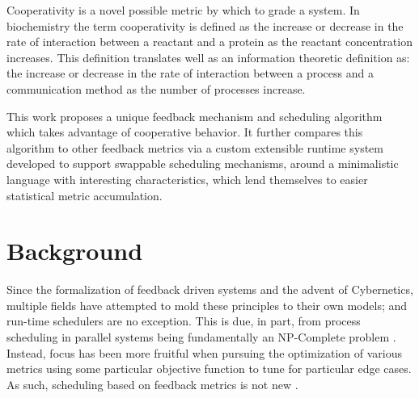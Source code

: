 Cooperativity is a novel possible metric by which to grade a system. In biochemistry the term cooperativity
is defined as the increase or decrease in the rate of interaction between a reactant and a protein as
the reactant concentration increases. This definition translates well as an information theoretic definition
as: the increase or decrease in the rate of interaction between a process and a communication method as the
number of processes increase. 

This work proposes a unique feedback mechanism and scheduling algorithm which takes advantage of cooperative behavior.
It further compares this algorithm to other feedback metrics via a custom extensible runtime system developed to
support swappable scheduling mechanisms, around a minimalistic language with interesting characteristics, which 
lend themselves to easier statistical metric accumulation.
\vfill{}

\setcounter{page}{0} 
\newpage{}

\section{Background} %

Since the formalization of feedback driven systems and the advent of Cybernetics, multiple fields have attempted 
to mold these principles to their own models; and run-time schedulers are no exception. This is due, in part, from
process scheduling in parallel systems being fundamentally an NP-Complete problem \cite{bruno1976computer}. Instead,
focus has been more fruitful when pursuing the optimization of various metrics using some particular objective 
function \cite{garey1978performance} to tune for particular edge cases. As such, scheduling based on feedback 
metrics is not new \cite{dietz1997use}.

